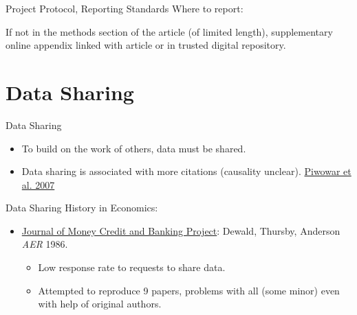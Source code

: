\documentclass{beamer}
\begin{document}
\begin{frame}{Project Protocol, Reporting Standards}
Where to report:

If not in the methods section of the article (of limited length), supplementary online appendix linked with article or in trusted digital repository.
\end{frame}
\section{Data Sharing}
\begin{frame}{Data Sharing}
\begin{itemize}
\item
To build on the work of others, data must be shared.
\item
Data sharing is associated with more citations (causality unclear). \href{http://journals.plos.org/plosone/article?id=10.1371/journal.pone.0000308}{Piwowar et al. 2007} 
\end{itemize}
\end{frame}

\begin{frame}{Data Sharing}
History in Economics:
\begin{itemize}
\item  \href{http://www.jstor.org/stable/1806061}{Journal of Money Credit and Banking Project}: Dewald, Thursby, Anderson \textit{AER} 1986. 
\begin{itemize}
\item Low response rate to requests to share data.
\item Attempted to reproduce 9 papers, problems with all (some minor) even with help of original authors.
\end{itemize}
\end{itemize}
\end{frame}
\end{document}
